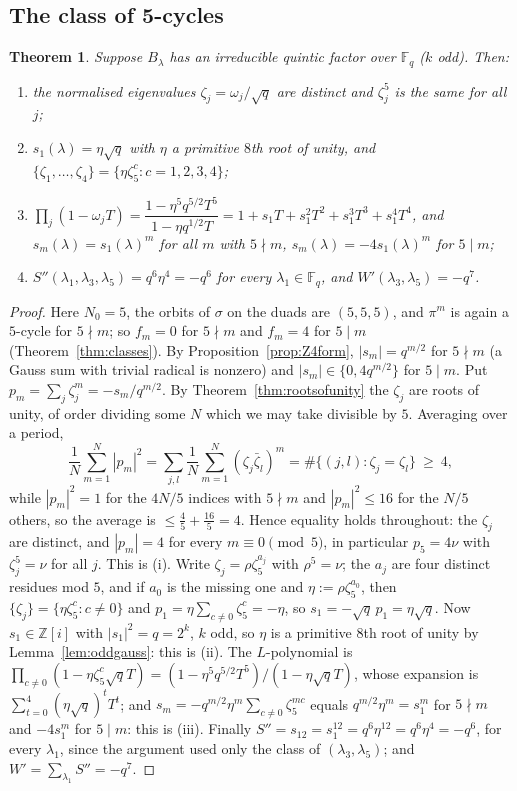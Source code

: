 \documentclass[12pt,a4paper]{amsart}
\newtheorem{theorem}{Theorem}[section]
\theoremstyle{definition}
\newcommand{\F}{\mathbb{F}}
\newcommand{\Z}{\mathbb{Z}}
\newcommand{\Spp}{S''}
\begin{document}
\subsection{The class of 5-cycles}
\begin{theorem}\label{thm:fivecycle}
Suppose $B_\lambda$ has an irreducible quintic factor over $\F_q$ ($k$ odd). Then:
\begin{enumerate}[label=\textup{(\roman*)},leftmargin=2em]
\item the normalised eigenvalues $\zeta_j=\omega_j/\sqrt q$ are distinct and $\zeta_j^5$ is the same for all $j$;
\item $s_1(\lambda)=\eta\sqrt q$ with $\eta$ a primitive $8$th root of unity, and $\{\zeta_1,\dots,\zeta_4\}=\{\eta\zeta_5^c:c=1,2,3,4\}$;
\item $\prod_j(1-\omega_jT)=\dfrac{1-\eta^5q^{5/2}T^5}{1-\eta q^{1/2}T}=1+s_1T+s_1^2T^2+s_1^3T^3+s_1^4T^4$, and $s_m(\lambda)=s_1(\lambda)^m$ for all $m$ with $5\nmid m$, $s_m(\lambda)=-4s_1(\lambda)^m$ for $5\mid m$;
\item $\Spp(\lambda_1,\lambda_3,\lambda_5)=q^6\eta^4=-q^6$ for every $\lambda_1\in\F_q$, and $W'(\lambda_3,\lambda_5)=-q^7$.
\end{enumerate}
\end{theorem}
\begin{proof}
Here $N_0=5$, the orbits of $\sigma$ on the duads are $(5,5,5)$, and $\pi^m$ is again a $5$-cycle for $5\nmid m$; so $f_m=0$ for $5\nmid m$ and $f_m=4$ for $5\mid m$ (Theorem~\ref{thm:classes}). By Proposition~\ref{prop:Z4form}, $|s_m|=q^{m/2}$ for $5\nmid m$ (a Gauss sum with trivial radical is nonzero) and $|s_m|\in\{0,4q^{m/2}\}$ for $5\mid m$. Put $p_m=\sum_j\zeta_j^m=-s_m/q^{m/2}$. By Theorem~\ref{thm:rootsofunity} the $\zeta_j$ are roots of unity, of order dividing some $N$ which we may take divisible by $5$. Averaging over a period,
\[
\frac1N\sum_{m=1}^N|p_m|^2=\sum_{j,l}\frac1N\sum_{m=1}^N(\zeta_j\bar\zeta_l)^m=\#\{(j,l):\zeta_j=\zeta_l\}\ \ge\ 4 ,
\]
while $|p_m|^2=1$ for the $4N/5$ indices with $5\nmid m$ and $|p_m|^2\le16$ for the $N/5$ others, so the average is $\le\frac45+\frac{16}5=4$. Hence equality holds throughout: the $\zeta_j$ are distinct, and $|p_m|=4$ for every $m\equiv0\pmod5$, in particular $p_5=4\nu$ with $\zeta_j^5=\nu$ for all $j$. This is (i). Write $\zeta_j=\rho\zeta_5^{a_j}$ with $\rho^5=\nu$; the $a_j$ are four distinct residues mod $5$, and if $a_0$ is the missing one and $\eta:=\rho\zeta_5^{a_0}$, then $\{\zeta_j\}=\{\eta\zeta_5^c:c\ne0\}$ and $p_1=\eta\sum_{c\ne0}\zeta_5^c=-\eta$, so $s_1=-\sqrt q\,p_1=\eta\sqrt q$. Now $s_1\in\Z[i]$ with $|s_1|^2=q=2^k$, $k$ odd, so $\eta$ is a primitive $8$th root of unity by Lemma~\ref{lem:oddgauss}: this is (ii). The $L$-polynomial is $\prod_{c\ne0}(1-\eta\zeta_5^c\sqrt qT)=(1-\eta^5q^{5/2}T^5)/(1-\eta\sqrt qT)$, whose expansion is $\sum_{t=0}^4(\eta\sqrt q)^tT^t$; and $s_m=-q^{m/2}\eta^m\sum_{c\ne0}\zeta_5^{mc}$ equals $q^{m/2}\eta^m=s_1^m$ for $5\nmid m$ and $-4s_1^m$ for $5\mid m$: this is (iii). Finally $\Spp=s_{12}=s_1^{12}=q^6\eta^{12}=q^6\eta^4=-q^6$, for every $\lambda_1$, since the argument used only the class of $(\lambda_3,\lambda_5)$; and $W'=\sum_{\lambda_1}\Spp=-q^7$.
\end{proof}
\end{document}
